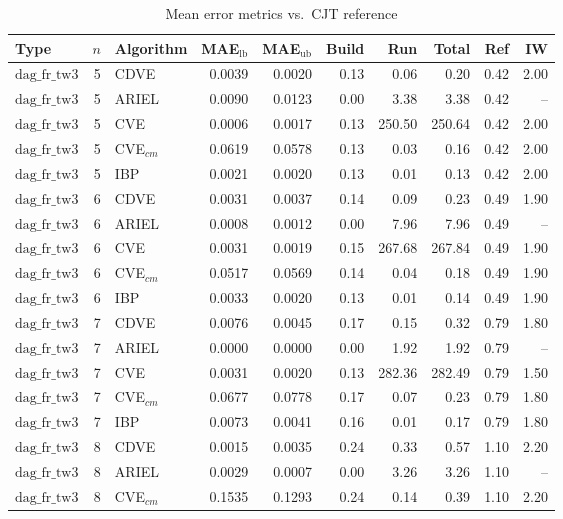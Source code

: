 \begin{table}[ht]
\centering
\scriptsize
\caption{Mean error metrics vs.\ CJT reference}
\begin{tabular}{lrlrrrrrrr}
\toprule
Type & $n$ & Algorithm & MAE$_{\text{lb}}$ & MAE$_{\text{ub}}$ & Build & Run & Total & Ref & IW \\
\midrule
$\text{dag\_fr\_tw3}$ & 5 & CDVE & 0.0039 & 0.0020 & 0.13 & 0.06 & 0.20 & 0.42 & 2.00 \\
$\text{dag\_fr\_tw3}$ & 5 & ARIEL & 0.0090 & 0.0123 & 0.00 & 3.38 & 3.38 & 0.42 & -- \\
$\text{dag\_fr\_tw3}$ & 5 & CVE & 0.0006 & 0.0017 & 0.13 & 250.50 & 250.64 & 0.42 & 2.00 \\
$\text{dag\_fr\_tw3}$ & 5 & CVE$_{cm}$ & 0.0619 & 0.0578 & 0.13 & 0.03 & 0.16 & 0.42 & 2.00 \\
$\text{dag\_fr\_tw3}$ & 5 & IBP & 0.0021 & 0.0020 & 0.13 & 0.01 & 0.13 & 0.42 & 2.00 \\
\hline
$\text{dag\_fr\_tw3}$ & 6 & CDVE & 0.0031 & 0.0037 & 0.14 & 0.09 & 0.23 & 0.49 & 1.90 \\
$\text{dag\_fr\_tw3}$ & 6 & ARIEL & 0.0008 & 0.0012 & 0.00 & 7.96 & 7.96 & 0.49 & -- \\
$\text{dag\_fr\_tw3}$ & 6 & CVE & 0.0031 & 0.0019 & 0.15 & 267.68 & 267.84 & 0.49 & 1.90 \\
$\text{dag\_fr\_tw3}$ & 6 & CVE$_{cm}$ & 0.0517 & 0.0569 & 0.14 & 0.04 & 0.18 & 0.49 & 1.90 \\
$\text{dag\_fr\_tw3}$ & 6 & IBP & 0.0033 & 0.0020 & 0.13 & 0.01 & 0.14 & 0.49 & 1.90 \\
\hline
$\text{dag\_fr\_tw3}$ & 7 & CDVE & 0.0076 & 0.0045 & 0.17 & 0.15 & 0.32 & 0.79 & 1.80 \\
$\text{dag\_fr\_tw3}$ & 7 & ARIEL & 0.0000 & 0.0000 & 0.00 & 1.92 & 1.92 & 0.79 & -- \\
$\text{dag\_fr\_tw3}$ & 7 & CVE & 0.0031 & 0.0020 & 0.13 & 282.36 & 282.49 & 0.79 & 1.50 \\
$\text{dag\_fr\_tw3}$ & 7 & CVE$_{cm}$ & 0.0677 & 0.0778 & 0.17 & 0.07 & 0.23 & 0.79 & 1.80 \\
$\text{dag\_fr\_tw3}$ & 7 & IBP & 0.0073 & 0.0041 & 0.16 & 0.01 & 0.17 & 0.79 & 1.80 \\
\hline
$\text{dag\_fr\_tw3}$ & 8 & CDVE & 0.0015 & 0.0035 & 0.24 & 0.33 & 0.57 & 1.10 & 2.20 \\
$\text{dag\_fr\_tw3}$ & 8 & ARIEL & 0.0029 & 0.0007 & 0.00 & 3.26 & 3.26 & 1.10 & -- \\
$\text{dag\_fr\_tw3}$ & 8 & CVE$_{cm}$ & 0.1535 & 0.1293 & 0.24 & 0.14 & 0.39 & 1.10 & 2.20 \\

\end{tabular}
\end{table}
